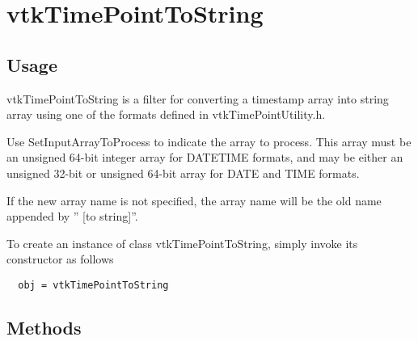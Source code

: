 \section{vtkTimePointToString}

\subsection{Usage}


 vtkTimePointToString is a filter for converting a timestamp array
 into string array using one of the formats defined in vtkTimePointUtility.h.

 Use SetInputArrayToProcess to indicate the array to process.  
 This array must be an unsigned 64-bit integer array for 
 DATETIME formats, and may be either an unsigned 32-bit or 
 unsigned 64-bit array for DATE and TIME formats.

 If the new array name is not specified, the array name will be
 the old name appended by '' [to string]''.

To create an instance of class vtkTimePointToString, simply
invoke its constructor as follows
\begin{verbatim}
  obj = vtkTimePointToString
\end{verbatim}
\subsection{Methods}


